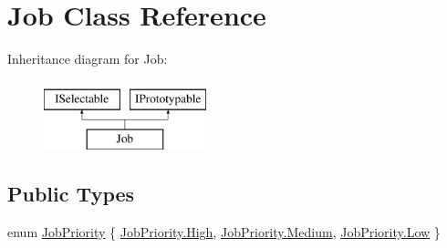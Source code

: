 \hypertarget{class_job}{}\section{Job Class Reference}
\label{class_job}
Inheritance diagram for Job\+:\begin{figure}[H]
\begin{center}
\leavevmode
\includegraphics[height=2.000000cm]{class_job}
\end{center}
\end{figure}
\subsection*{Public Types}
\begin{DoxyCompactItemize}
\item 
enum \hyperlink{class_job_a9c7ab1966c2a0a1d29a7f5822cbca45a}{Job\+Priority} \{ \hyperlink{class_job_a9c7ab1966c2a0a1d29a7f5822cbca45aa655d20c1ca69519ca647684edbb2db35}{Job\+Priority.\+High}, 
\hyperlink{class_job_a9c7ab1966c2a0a1d29a7f5822cbca45aa87f8a6ab85c9ced3702b4ea641ad4bb5}{Job\+Priority.\+Medium}, 
\hyperlink{class_job_a9c7ab1966c2a0a1d29a7f5822cbca45aa28d0edd045e05cf5af64e35ae0c4c6ef}{Job\+Priority.\+Low}
 \}
\end{DoxyCompactItemize}
